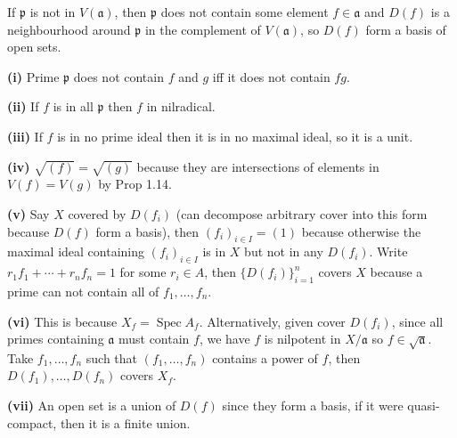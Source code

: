 If $\mathfrak p$ is not in $V(\mathfrak a)$, then $\mathfrak p$ does not contain some element $f\in\mathfrak a$ and $D(f)$ is a neighbourhood around $\mathfrak p$ in the complement of $V(\mathfrak a)$, so $D(f)$ form a basis of open sets.

\textbf{(i)} Prime $\mathfrak p$ does not contain $f$ and $g$ iff it does not contain $fg$.

\textbf{(ii)} If $f$ is in all $\mathfrak p$ then $f$ in nilradical.

\textbf{(iii)} If $f$ is in no prime ideal then it is in no maximal ideal, so it is a unit.

\textbf{(iv)} $\sqrt{(f)}=\sqrt{(g)}$ because they are intersections of elements in $V(f)=V(g)$ by Prop 1.14.

\textbf{(v)} Say $X$ covered by $D(f_i)$ (can decompose arbitrary cover into this form because $D(f)$ form a basis), then $(f_i)_{i\in I}=(1)$ because otherwise the maximal ideal containing $(f_i)_{i\in I}$ is in $X$ but not in any $D(f_i)$. Write $r_1f_1+\cdots+r_nf_n=1$ for some $r_i\in A$, then $\{D(f_i)\}_{i=1}^n$ covers $X$ because a prime can not contain all of $f_1,\ldots,f_n$.

\textbf{(vi)} This is because $X_f=\operatorname{Spec}A_f$. Alternatively, given cover $D(f_i)$, since all primes containing $\mathfrak a$ must contain $f$, we have $f$ is nilpotent in $X/\mathfrak a$ so $f\in\sqrt{\mathfrak a}$. Take $f_1,\ldots,f_n$ such that $(f_1,\ldots,f_n)$ contains a power of $f$, then $D(f_1),\ldots,D(f_n)$ covers $X_f$.

\textbf{(vii)} An open set is a union of $D(f)$ since they form a basis, if it were quasi-compact, then it is a finite union.
